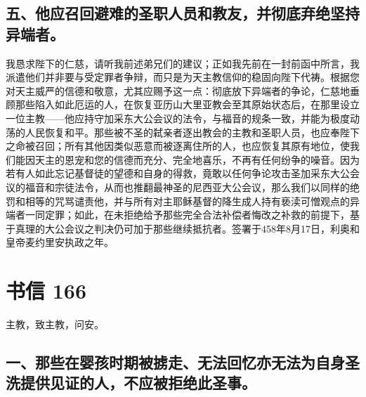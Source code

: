 
\subsection{五、他应召回避难的圣职人员和教友，并彻底弃绝坚持异端者。}

我恳求陛下的仁慈，请听我前述弟兄们的建议；正如我先前在一封前函中所言，我派遣他们并非要与受定罪者争辩，而只是为天主教信仰的稳固向陛下代祷。根据您对天主威严的信德和敬意，尤其应赐予这一点：彻底放下异端者的争论，仁慈地垂顾那些陷入如此厄运的人，在恢复亚历山大里亚教会至其原始状态后，在那里设立一位主教——他应持守加采东大公会议的法令，与福音的规条一致，并能为极度动荡的人民恢复和平。那些被不圣的弑亲者逐出教会的主教和圣职人员，也应奉陛下之命被召回；所有其他因类似恶意而被逐离住所的人，也应恢复其原有地位，使我们能因天主的恩宠和您的信德而充分、完全地喜乐，不再有任何纷争的噪音。因为若有人如此忘记基督徒的望德和自身的得救，竟敢以任何争论攻击圣加采东大公会议的福音和宗徒法令，从而也推翻最神圣的尼西亚大公会议，那么我们以同样的绝罚和相等的咒骂谴责他，并与所有对主耶稣基督的降生成人持有亵渎可憎观点的异端者一同定罪；如此，在未拒绝给予那些完全合法补偿者悔改之补救的前提下，基于真理的大公会议之判决仍可加于那些继续抵抗者。签署于458年8月17日，利奥和皇帝麦约里安执政之年。\par



\section{书信 166}

主教，致主教，问安。\par


\subsection{一、那些在婴孩时期被掳走、无法回忆亦无法为自身圣洗提供见证的人，不应被拒绝此圣事。}

